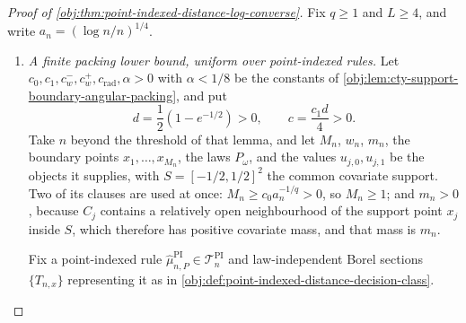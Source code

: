 \begin{proof}[Proof of \cref{obj:thm:point-indexed-distance-log-converse}]
Fix \(q\geq 1\) and \(L\geq 4\), and write \(a_n=(\log n/n)^{1/4}\).
\begin{enumerate}
\item
\emph{A finite packing lower bound, uniform over point-indexed rules.}
Let \(c_0,c_1,c_w^-,c_w^+,c_{\mathrm{rad}},\alpha>0\) with \(\alpha<1/8\) be the constants of \cref{obj:lem:cty-support-boundary-angular-packing}, and put
\[
d=\frac12\left(1-e^{-1/2}\right)>0,
\qquad
c=\frac{c_1d}{4}>0 .
\]
Take \(n\) beyond the threshold of that lemma, and let \(M_n\), \(w_n\), \(m_n\), the boundary points \(x_1,\ldots,x_{M_n}\), the laws \(P_\omega\), and the values \(u_{j,0},u_{j,1}\) be the objects it supplies, with \(S=[-1/2,1/2]^2\) the common covariate support.  Two of its clauses are used at once: \(M_n\geq c_0a_n^{-1/q}>0\), so \(M_n\geq1\); and \(m_n>0\), because \(C_j\) contains a relatively open neighbourhood of the support point \(x_j\) inside \(S\), which therefore has positive covariate mass, and that mass is \(m_n\).

Fix a point-indexed rule \(\widehat\mu^{\mathrm{PI}}_{n,P}\in\mathcal T_n^{\mathrm{PI}}\) and law-independent Borel sections \(\{T_{n,x}\}\) representing it as in \cref{obj:def:point-indexed-distance-decision-class}.


\end{enumerate}
\end{proof}
